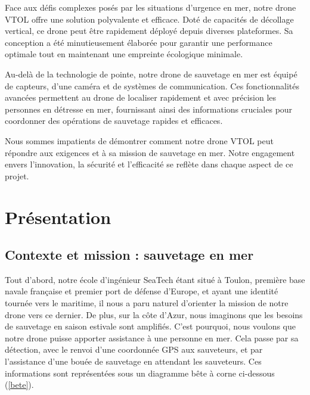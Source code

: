 \documentclass[a4paper,12pt,french]{report}
\begin{document}
Face aux défis complexes posés par les situations d'urgence en mer, notre drone VTOL offre une solution polyvalente et efficace. Doté de capacités de décollage vertical, ce drone peut être rapidement déployé depuis diverses plateformes. Sa conception a été minutieusement élaborée pour garantir une performance optimale tout en maintenant une empreinte écologique minimale.\newline

Au-delà de la technologie de pointe, notre drone de sauvetage en mer est équipé de capteurs, d’une caméra et de systèmes de communication. Ces fonctionnalités avancées permettent au drone de localiser rapidement et avec précision les personnes en détresse en mer, fournissant ainsi des informations cruciales pour coordonner des opérations de sauvetage rapides et efficaces.\newline

Nous sommes impatients de démontrer comment notre drone VTOL peut répondre aux exigences et à sa mission de sauvetage en mer. Notre engagement envers l'innovation, la sécurité et l'efficacité se reflète dans chaque aspect de ce projet.

\chapter{Présentation}

\section{Contexte et mission : sauvetage en mer}

Tout d'abord, notre école d'ingénieur SeaTech étant situé à Toulon, première base navale française et premier port de défense d'Europe, et ayant une identité tournée vers le maritime, il nous a paru naturel d'orienter la mission de notre drone vers ce dernier. De plus, sur la côte d'Azur, nous imaginons que les besoins de sauvetage en saison estivale sont amplifiés. C'est pourquoi, nous voulons que notre drone puisse apporter assistance à une personne en mer. Cela passe par sa détection, avec le renvoi d'une coordonnée GPS aux sauveteurs, et par l'assistance d'une bouée de sauvetage en attendant les sauveteurs. Ces informations sont représentées sous un diagramme bête à corne ci-dessous (\ref{bete}).
\bigskip
\end{document}
